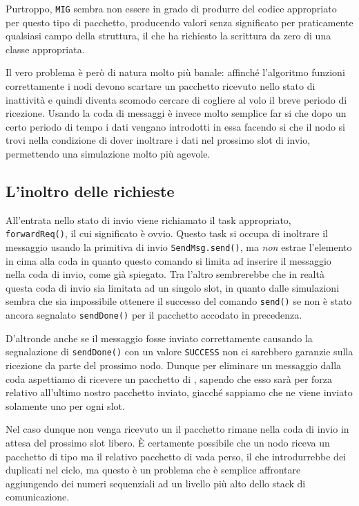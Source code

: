 \documentclass[twoside,11pt,a4paper,italian,openany]{book}
\begin{document}
Purtroppo, \texttt{MIG} sembra non essere in grado di produrre del codice appropriato per questo tipo di pacchetto, producendo valori senza significato per praticamente qualsiasi 
campo della struttura, il che ha richiesto la scrittura da zero di una classe appropriata. 
 

Il vero problema è però di natura molto più banale: affinché l'algoritmo funzioni correttamente 
i nodi devono scartare un pacchetto ricevuto nello stato di inattività e quindi diventa scomodo
cercare di cogliere al volo il breve periodo di ricezione. 
Usando la coda di messaggi è invece molto semplice far si che dopo un certo periodo di tempo 
i dati vengano introdotti in essa facendo si che il nodo si trovi nella condizione di dover 
inoltrare i dati nel prossimo slot di invio, permettendo una simulazione molto più agevole. 


\subsection{L'inoltro delle richieste}
All'entrata nello stato di invio viene richiamato il task appropriato, 
\texttt{forwardReq()}, il cui significato è ovvio.
Questo task si occupa di inoltrare il messaggio usando la primitiva di invio 
\texttt{SendMsg.send()},
ma \emph{non} estrae l'elemento in cima alla coda in quanto questo comando si limita 
ad inserire il messaggio  nella coda di invio, come già spiegato. 
Tra l'altro sembrerebbe che in realtà questa coda di invio sia limitata ad un singolo slot, 
in quanto dalle simulazioni sembra che sia impossibile ottenere il successo del comando 
\texttt{send()} se non è stato ancora segnalato \texttt{sendDone()} per il pacchetto accodato
in precedenza. 


D'altronde anche se il messaggio fosse inviato correttamente causando la segnalazione di 
\texttt{sendDone()} con un valore \texttt{SUCCESS}  
non ci sarebbero garanzie sulla ricezione da parte del prossimo nodo. 
Dunque per eliminare un messaggio dalla coda aspettiamo di ricevere 
un pacchetto di \ack, sapendo che esso sarà per forza relativo all'ultimo nostro pacchetto 
inviato, giacché sappiamo che ne viene inviato solamente uno per ogni slot. 

Nel caso dunque non venga ricevuto un \ack il pacchetto rimane nella coda di invio in attesa 
del prossimo slot libero. \`E certamente possibile che un nodo riceva un pacchetto di tipo \req 
ma il relativo pacchetto di \ack vada perso, il che introdurrebbe dei duplicati nel ciclo, 
ma questo è un problema che è semplice affrontare aggiungendo dei numeri sequenziali ad un 
livello più alto dello stack di comunicazione. 
\end{document}
